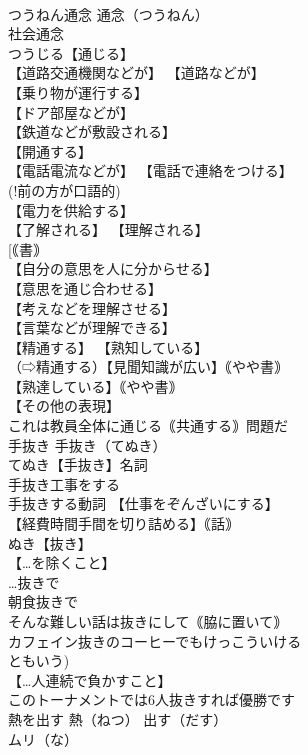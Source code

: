 \documentclass[8pt]{extreport}
\begin{document}
\begin{CJK}{UTF8}{min}
\\	つうねん通念		通念（つうねん） 
\\	社会通念 
\\	つうじる【通じる】 
\\	【道路交通機関などが】 【道路などが】
\\	【乗り物が運行する】
\\	【ドア部屋などが】
\\	【鉄道などが敷設される】
\\	【開通する】
\\	【電話電流などが】 【電話で連絡をつける】
\\	(!前の方が口語的) 
\\	【電力を供給する】
\\	【了解される】 【理解される】
\\	[｟書｠ 
\\	【自分の意思を人に分からせる】
\\	【意思を通じ合わせる】
\\	【考えなどを理解させる】
\\	【言葉などが理解できる】
\\	【精通する】 【熟知している】
\\	（⇨精通する）【見聞知識が広い】｟やや書｠
\\	【熟達している】｟やや書｠
\\	【その他の表現】 
\\	これは教員全体に通じる｟共通する｠問題だ 
\\	手抜き		手抜き（てぬき） 
\\	てぬき【手抜き】名詞 
\\	手抜き工事をする 
\\	手抜きする動詞 【仕事をぞんざいにする】
\\	【経費時間手間を切り詰める】｟話｠
\\	ぬき【抜き】 
\\	【…を除くこと】 
\\	…抜きで 
\\	朝食抜きで 
\\	そんな難しい話は抜きにして｟脇に置いて｠ 
\\	カフェイン抜きのコーヒーでもけっこういける 
\\	ともいう) 
\\	【…人連続で負かすこと】 
\\	このトーナメントでは6人抜きすれば優勝です 
\\	熱を出す		熱（ねつ） 出す（だす） 
\\	ムリ（な）		

\end{CJK}
\end{document}
